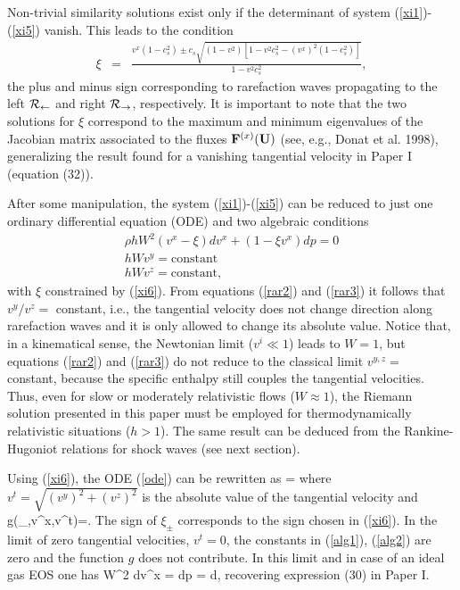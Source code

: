   Non-trivial similarity solutions exist only if the determinant of system
(\ref{xi1})-(\ref{xi5}) vanish. This leads to the condition
\begin{eqnarray}
\xi & = & \frac{v^x(1-c_s^2) \pm c_s
\sqrt{(1-v^2)[1 - v^2 c_s^2 - (v^x)^2(1-c_s^2)]}}{1-v^2c_s^2},
\label{xi6} 
\end{eqnarray}
the plus and minus sign corresponding to rarefaction waves propagating
to the left ${\cal R}_{\leftarrow}$ and right ${\cal
R}_{\rightarrow}$, respectively.  It is important to note that the two
solutions for $\xi$ correspond to the maximum and minimum eigenvalues
of the Jacobian matrix associated to the fluxes ${\bf F}^{(x)}({\bf
U})$ (see, e.g., Donat et al. 1998), generalizing the result found for a
vanishing tangential velocity in Paper I (equation (32)).

  After some manipulation, the system (\ref{xi1})-(\ref{xi5}) can be reduced to
just one ordinary differential equation (ODE) and two algebraic conditions
\begin{eqnarray}
\rho h W^2 (v^x-\xi) dv^x + (1-\xi v^x) dp = 0 \label{ode} \label{rar1} \\
h W v^y = \mbox{constant} \label{alg1} \label{rar2} \\
h W v^z = \mbox{constant} \label{alg2} \label{rar3},
\end{eqnarray}
with $\xi$ constrained by (\ref{xi6}). From equations (\ref{rar2}) and
(\ref{rar3}) it follows that $v^y/v^z =$ constant, i.e., the
tangential velocity does not change direction along rarefaction waves
and it is only allowed to change its absolute value. Notice that, in a
kinematical sense, the Newtonian limit ($v^{i} \ll 1$) leads to $W=1$,
but equations (\ref{rar2}) and (\ref{rar3}) do not reduce to the
classical limit $v^{y,z}=$ constant, because the specific enthalpy
still couples the tangential velocities. Thus, even for slow or
moderately relativistic flows ($W \approx 1$),
the Riemann solution presented in this paper must be employed for
thermodynamically relativistic situations ($h > 1$).  The same
result can be deduced from the Rankine-Hugoniot relations for shock
waves (see next section).

  Using (\ref{xi6}), the ODE (\ref{ode}) can be rewritten as
\be
{}= \pm {}
\label{ode2}
\ee
where $v^t=\sqrt{(v^y)^2 + (v^z)^2}$ is the absolute value of the tangential
velocity and
\be
g(\xi_{\pm},v^x,v^t)=.
\ee
The sign of $\xi_{\pm}$ corresponds to the sign chosen in
(\ref{xi6}). In the limit of zero tangential velocities, $v^t=0$, the
constants in (\ref{alg1}), (\ref{alg2}) are zero and the function $g$
does not contribute. 
In this limit and in case of an ideal gas EOS one has 
\be
W^2 dv^x = \pm {} dp = \pm {} d\rho,
\ee
recovering expression (30) in Paper I.

